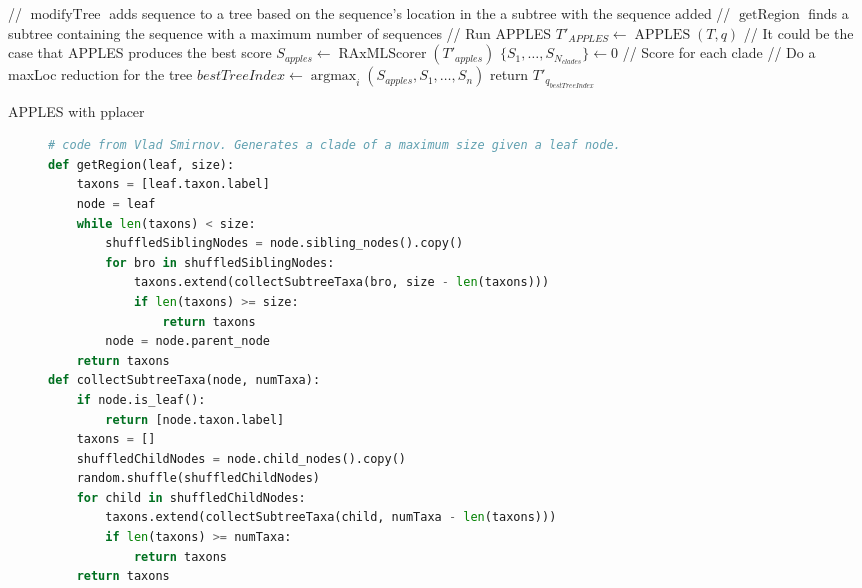 \documentclass[10pt]{article}
\begin{document}
\begin{algorithm}[H]
\SetAlgoLined
{}
 // $\operatorname{modifyTree}$ adds sequence to a tree based on the sequence's location in the a subtree with the sequence added\;
 // $\operatorname{getRegion}$ finds a subtree containing the sequence with a maximum number of sequences\;
  // Run APPLES\;
  $T'_{APPLES} \leftarrow \operatorname{APPLES}(T, q)$\;
  // It could be the case that APPLES produces the best score\;
  $S_{apples} \leftarrow \operatorname{RAxMLScorer}( T'_{apples})$\;
  $\{S_1, \dots, S_{N_{clades}}\} \leftarrow 0$ // Score for each clade\;
 // Do a maxLoc reduction for the tree\;
 $bestTreeIndex \leftarrow \operatorname{argmax}_{i} (S_{apples},S_1,\dots,S_n)$\;
 return $T'_{q_{bestTreeIndex}}$\;
\caption{APPLES with pplacer}
 \label{alg:approach2}
\end{algorithm}

\begin{figure}[H]
\centering
\begin{lstlisting}[language=python]
# code from Vlad Smirnov. Generates a clade of a maximum size given a leaf node.
def getRegion(leaf, size):
    taxons = [leaf.taxon.label]
    node = leaf
    while len(taxons) < size:
        shuffledSiblingNodes = node.sibling_nodes().copy()
        for bro in shuffledSiblingNodes:
            taxons.extend(collectSubtreeTaxa(bro, size - len(taxons)))
            if len(taxons) >= size:
                return taxons
        node = node.parent_node
    return taxons
def collectSubtreeTaxa(node, numTaxa):
    if node.is_leaf():
        return [node.taxon.label]
    taxons = []
    shuffledChildNodes = node.child_nodes().copy()
    random.shuffle(shuffledChildNodes)
    for child in shuffledChildNodes:
        taxons.extend(collectSubtreeTaxa(child, numTaxa - len(taxons)))
        if len(taxons) >= numTaxa:
            return taxons
    return taxons
\end{lstlisting}
\label{alg:clade-grabber}
\end{figure}



\end{document}
